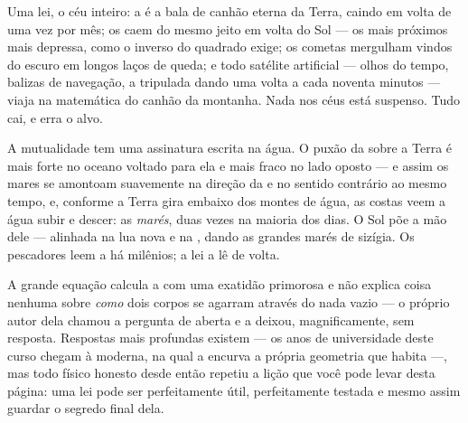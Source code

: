 \begin{proposition}\label{prop:g9:gravitation:runs}
Uma lei, o céu inteiro: a  é a bala de canhão eterna da Terra,
caindo em volta de  uma vez por mês; os  caem do mesmo
jeito em volta do Sol --- os mais próximos mais depressa, como o
inverso do quadrado exige; os cometas mergulham vindos do escuro em
longos laços de queda; e todo satélite artificial --- olhos do tempo,
balizas de navegação, a  tripulada dando uma volta a cada
noventa minutos --- viaja na matemática do canhão da montanha. Nada
nos céus está suspenso. Tudo cai, e erra o alvo.
\end{proposition}

\begin{example}\label{ex:g9:gravitation:tides}
A mutualidade tem uma assinatura escrita na água. O puxão da 
sobre a Terra é mais forte no oceano voltado para ela e mais fraco no
lado oposto --- e assim os mares se amontoam suavemente na direção da
 e no sentido contrário ao mesmo tempo, e, conforme a Terra gira
embaixo dos montes de água, as costas veem a água subir e descer: as
\emph{marés}, duas vezes na maioria dos dias. O Sol põe a mão dele ---
alinhada na lua nova e na , dando as grandes marés de
sizígia. Os pescadores leem a  há milênios; a lei a lê de volta.
\end{example}

\begin{remark}\label{rem:g9:gravitation:notsay}
A grande equação calcula a  com uma exatidão primorosa e não
explica coisa nenhuma sobre \emph{como} dois corpos se agarram
através do nada vazio --- o próprio autor dela chamou a pergunta de
aberta e a deixou, magnificamente, sem resposta. Respostas mais
profundas existem --- os anos de universidade deste curso chegam à
moderna, na qual a  encurva a própria geometria que habita ---,
mas todo físico honesto desde então repetiu a lição que você pode
levar desta página: uma lei pode ser perfeitamente útil,
perfeitamente testada e mesmo assim guardar o segredo final dela.
\end{remark}

